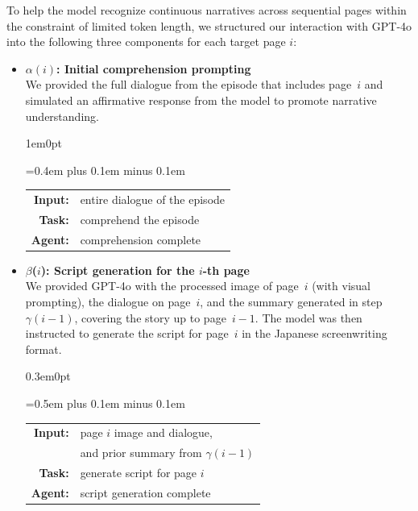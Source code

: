 To help the model recognize continuous narratives across sequential pages within the constraint of limited token length, we structured our interaction with GPT-4o into the following three components for each target page $i$:

\begin{itemize}
    \item \textbf{$\alpha(i)$: Initial comprehension prompting} \\
    We provided the full dialogue from the episode that includes page~$i$ and simulated an affirmative response from the model to promote narrative understanding.

    \vspace{0.5em}
    \begin{adjustwidth}{1em}{0pt}
      \setlength{\tabcolsep}{2pt}
      {\ttfamily\spaceskip=0.4em plus 0.1em minus 0.1em
      \begin{tabular}{@{}r l@{}}
      \textbf{Input:} & entire dialogue of the episode\\
      \textbf{Task:} & comprehend the episode \\
      \textbf{Agent:} & comprehension complete \\
      \end{tabular}
      }
  \end{adjustwidth}
  \vspace{0.5em}

    \item \textbf{$\beta$($i$): Script generation for the $i$-th page} \\
    We provided GPT-4o with the processed image of page~$i$ (with visual prompting), the dialogue on page~$i$, and the summary generated in step $\gamma(i{-}1)$, covering the story up to page~$i{-}1$. The model was then instructed to generate the script for page~$i$ in the Japanese screenwriting format.

    \vspace{0.5em}
    \begin{adjustwidth}{0.3em}{0pt}
      \setlength{\tabcolsep}{2pt}
      {\ttfamily\spaceskip=0.5em plus 0.1em minus 0.1em
      \begin{tabular}{@{}r l@{}}
      \textbf{Input:} & page $i$ image and dialogue,\\
                      & and prior summary from $\gamma(i{-}1)$\\
      \textbf{Task:} & generate script for page $i$  \\
      \textbf{Agent:} & script generation complete \\
      \end{tabular}
      }
  \end{adjustwidth}
  \vspace{0.5em} 


\end{itemize}
